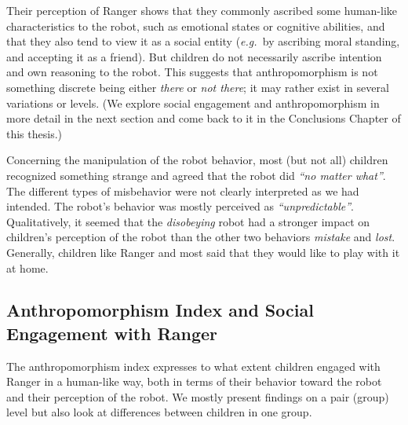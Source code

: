 \documentclass{sig-alternate}
\newcommand{\eg}{{\textit{e.g.~}}}
\begin{document}
Their perception of Ranger shows that they commonly ascribed some human-like
characteristics to the robot, such as emotional states or cognitive abilities,
and that they also tend to view it as a social entity (\eg by ascribing moral
standing, and accepting it as a friend). But children do not necessarily ascribe
intention and own reasoning to the robot. This suggests that anthropomorphism is
not something discrete being either \textit{there} or \textit{not there}; it may
rather exist in several variations or levels. (We explore social engagement and
anthropomorphism in more detail in the next section and come back to it in the
Conclusions Chapter of this thesis.) 

Concerning the manipulation of the robot behavior, most (but not all) children
recognized something strange and agreed that the robot did \textit{``no matter
what''}. The different types of misbehavior were not clearly interpreted as we
had intended. The robot's behavior was mostly perceived as
\textit{``unpredictable''}. Qualitatively, it seemed that the
\textit{disobeying} robot had a stronger impact on children's perception of the
robot than the other two behaviors \textit{mistake} and \textit{lost}.
Generally, children like Ranger and most said that they would like to play with
it at home.\\



\subsection{Anthropomorphism Index and Social Engagement with Ranger}

The anthropomorphism index expresses to what extent children engaged with Ranger
in a human-like way, both in terms of their behavior toward the robot and their
perception of the robot. We mostly present findings on a pair (group) level but
also look at differences between children in one group. 
\end{document}
